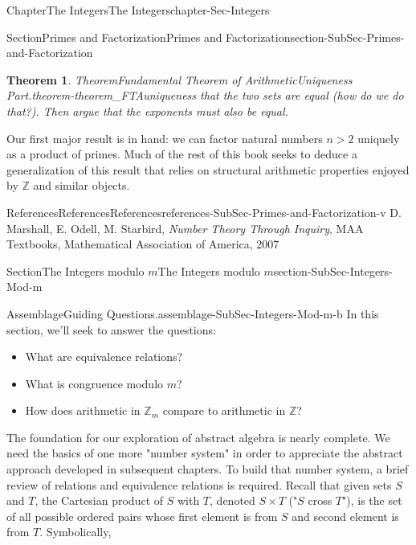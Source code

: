 \documentclass[oneside,10pt,]{book}
\numberwithin{equation}{section}
\def\Z{{\mathbb Z}}
\newtheorem{theorem}{Theorem}[section]
\begin{document}
\begin{chapterptx}{Chapter}{The Integers}{}{The Integers}{}{}{chapter-Sec-Integers}
\begin{sectionptx}{Section}{Primes and Factorization}{}{Primes and Factorization}{}{}{section-SubSec-Primes-and-Factorization}
\begin{theorem}{Theorem}{Fundamental Theorem of Arithmetic\textendash{}Uniqueness Part.}{}{theorem-theorem_FTAuniqueness}
\noindentArgue that the two sets are equal (how do we do that?). Then argue that the exponents must also be equal.%
\end{theorem}
Our first major result is in hand: we can factor natural numbers \(n > 2\) uniquely as a product of primes. Much of the rest of this book seeks to deduce a generalization of this result that relies on structural arithmetic properties enjoyed by \(\Z\) and similar objects.%
%
%
\typeout{************************************************}
\typeout{************************************************}
%
\begin{references-subsection-numberless}{References}{References}{}{References}{}{}{references-SubSec-Primes-and-Factorization-v}
D. Marshall, E. Odell, M. Starbird, \emph{Number Theory Through Inquiry}, MAA Textbooks, Mathematical Association of America, 2007\end{references-subsection-numberless}
\end{sectionptx}
%
%
\typeout{************************************************}
\typeout{************************************************}
%
\begin{sectionptx}{Section}{The Integers modulo \(m\)}{}{The Integers modulo \(m\)}{}{}{section-SubSec-Integers-Mod-m}
\begin{assemblage}{Assemblage}{Guiding Questions.}{assemblage-SubSec-Integers-Mod-m-b}%
In this section, we'll seek to answer the questions: %
\begin{itemize}[label=\textbullet]
\item{}What are equivalence relations?%
\item{}What is congruence modulo \(m\)?%
\item{}How does arithmetic in \(\Z_m\) compare to arithmetic in \(\Z\)?%
\end{itemize}
%
\end{assemblage}
The foundation for our exploration of abstract algebra is nearly complete. We need the basics of one more "number system" in order to appreciate the abstract approach developed in subsequent chapters. To build that number system, a brief review of relations and equivalence relations is required. Recall that given sets \(S\) and \(T\), the Cartesian product of \(S\) with \(T\), denoted \(S\times T\) ("\(S\) cross \(T\)"), is the set of all possible ordered pairs whose first element is from \(S\) and second element is from \(T\). Symbolically,%
%
\begin{equation*}

\end{equation*}
\end{sectionptx}
\end{chapterptx}
\end{document}
